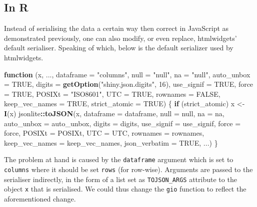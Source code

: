\documentclass[
]{krantz}
\makeatletter
\newenvironment{Shaded}{\begin{snugshade}}{\end{snugshade}}
\newcommand{\ControlFlowTok}[1]{\textcolor[rgb]{0.27,0.27,0.27}{\textbf{#1}}}
\newcommand{\DataTypeTok}[1]{\textcolor[rgb]{0.27,0.27,0.27}{#1}}
\newcommand{\DecValTok}[1]{\textcolor[rgb]{0.06,0.06,0.06}{#1}}
\newcommand{\KeywordTok}[1]{\textcolor[rgb]{0.27,0.27,0.27}{\textbf{#1}}}
\newcommand{\NormalTok}[1]{#1}
\newcommand{\OperatorTok}[1]{\textcolor[rgb]{0.43,0.43,0.43}{\textbf{#1}}}
\newcommand{\OtherTok}[1]{\textcolor[rgb]{0.37,0.37,0.37}{#1}}
\newcommand{\StringTok}[1]{\textcolor[rgb]{0.5,0.5,0.5}{#1}}
\newenvironment{kframe}{%
\medskip{}
\setlength{\fboxsep}{.8em}
 \def\at@end@of@kframe{}%
 \ifinner\ifhmode%
  \def\at@end@of@kframe{\end{minipage}}%
  \begin{minipage}{\columnwidth}%
 \fi\fi%
 \def\FrameCommand##1{\hskip\@totalleftmargin \hskip-\fboxsep
 \colorbox{shadecolor}{##1}\hskip-\fboxsep
     \hskip-\linewidth \hskip-\@totalleftmargin \hskip\columnwidth}%
 \MakeFramed {\advance\hsize-\width
   \@totalleftmargin\z@ \linewidth\hsize
   \@setminipage}}%
 {\par\unskip\endMakeFramed%
 \at@end@of@kframe}
\renewenvironment{Shaded}{\begin{kframe}}{\end{kframe}}
\makeatother
\begin{document}
\hypertarget{in-r}{%
\subsection{In R}\label{in-r}}

Instead of serialising the data a certain way then correct in JavaScript as demonstrated previously, one can also modify, or even replace, htmlwidgets' default serialiser. Speaking of which, below is the default serializer used by htmlwidgets.

\begin{Shaded}
\begin{Highlighting}[]
\ControlFlowTok{function}\NormalTok{ (x, ..., }\DataTypeTok{dataframe =} \StringTok{"columns"}\NormalTok{, }\DataTypeTok{null =} \StringTok{"null"}\NormalTok{, }\DataTypeTok{na =} \StringTok{"null"}\NormalTok{, }
  \DataTypeTok{auto\_unbox =} \OtherTok{TRUE}\NormalTok{, }\DataTypeTok{digits =} \KeywordTok{getOption}\NormalTok{(}\StringTok{"shiny.json.digits"}\NormalTok{, }\DecValTok{16}\NormalTok{), }
  \DataTypeTok{use\_signif =} \OtherTok{TRUE}\NormalTok{, }\DataTypeTok{force =} \OtherTok{TRUE}\NormalTok{, }\DataTypeTok{POSIXt =} \StringTok{"ISO8601"}\NormalTok{, }\DataTypeTok{UTC =} \OtherTok{TRUE}\NormalTok{, }
  \DataTypeTok{rownames =} \OtherTok{FALSE}\NormalTok{, }\DataTypeTok{keep\_vec\_names =} \OtherTok{TRUE}\NormalTok{, }\DataTypeTok{strict\_atomic =} \OtherTok{TRUE}\NormalTok{) }
\NormalTok{\{}
  \ControlFlowTok{if}\NormalTok{ (strict\_atomic) }
\NormalTok{      x <{-}}\StringTok{ }\KeywordTok{I}\NormalTok{(x)}
\NormalTok{  jsonlite}\OperatorTok{::}\KeywordTok{toJSON}\NormalTok{(x, }\DataTypeTok{dataframe =}\NormalTok{ dataframe, }\DataTypeTok{null =}\NormalTok{ null, }\DataTypeTok{na =}\NormalTok{ na, }
    \DataTypeTok{auto\_unbox =}\NormalTok{ auto\_unbox, }\DataTypeTok{digits =}\NormalTok{ digits, }\DataTypeTok{use\_signif =}\NormalTok{ use\_signif, }
    \DataTypeTok{force =}\NormalTok{ force, }\DataTypeTok{POSIXt =}\NormalTok{ POSIXt, }\DataTypeTok{UTC =}\NormalTok{ UTC, }\DataTypeTok{rownames =}\NormalTok{ rownames, }
    \DataTypeTok{keep\_vec\_names =}\NormalTok{ keep\_vec\_names, }\DataTypeTok{json\_verbatim =} \OtherTok{TRUE}\NormalTok{, ...)}
\NormalTok{\}}
\end{Highlighting}
\end{Shaded}

The problem at hand is caused by the \texttt{dataframe} argument which is set to \texttt{columns} where it should be set \texttt{rows} (for row-wise). Arguments are passed to the serialiser indirectly, in the form of a list set as \texttt{TOJSON\_ARGS} attribute to the object \texttt{x} that is serialised. We could thus change the \texttt{gio} function to reflect the aforementioned change.
\end{document}
